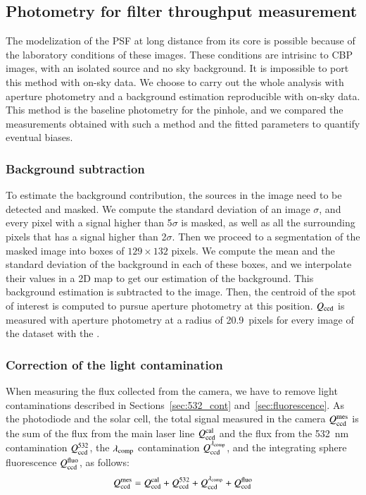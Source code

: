 \subsection{Photometry for filter throughput measurement}
\label{sec:photometry_small}

The modelization of the PSF at long distance from its core is possible because of the laboratory conditions of these images. These conditions are intrisinc to CBP images, with an isolated source and no sky background. It is impossible to port this method with on-sky data. We choose to carry out the whole analysis with aperture photometry and a background estimation reproducible with on-sky data. This method is the baseline photometry for the \spinhole pinhole, and we compared the measurements obtained with such a method and the fitted parameters to quantify eventual biases. 

\subsubsection{Background subtraction}
\label{sec:bkg}

To estimate the background contribution, the sources in the image need to be detected and masked. We compute the standard deviation of an image $\sigma$, and every pixel with a signal higher than 5$\sigma$ is masked, as well as all the surrounding pixels that has a signal higher than 2$\sigma$. Then we proceed to a segmentation of the masked image into boxes of $129\times132$ pixels. We compute the mean and the standard deviation of the background in each of these boxes, and we interpolate their values in a 2D map to get our estimation of the background. This background estimation is subtracted to the image. Then, the centroid of the spot of interest is computed to pursue aperture photometry at this position. $Q_{\mathrm{ccd}}$ is measured with aperture photometry at a radius of \SI{20.9}{pixels} for every image of the dataset with the \spinhole.

\subsubsection{Correction of the light contamination}\label{sec:sd_contaminations}

When measuring the flux collected from the \SD camera, we have to remove light contaminations described in Sections~\ref{sec:532_cont} and~\ref{sec:fluorescence}. As the photodiode and the solar cell, the total signal measured in the \SD camera $Q_{\mathrm{ccd}}^{\mathrm{mes}}$ is the sum of the flux from the main laser line $Q_{\mathrm{ccd}}^{\mathrm{cal}}$ and the flux from the \SI{532}{\nm} contamination $Q_{\mathrm{ccd}}^{532}$, the $\lambda_{\rm comp}$ contamination $Q_{\mathrm{ccd}}^{\lambda_{\rm comp}}$, and the integrating sphere fluorescence $Q_{\mathrm{ccd}}^{\mathrm{fluo}}$, as follows:
\begin{equation}
    Q_{\mathrm{ccd}}^{\mathrm{mes}} = Q_{\mathrm{ccd}}^{\mathrm{cal}} + Q_{\mathrm{ccd}}^{532} + Q_{\mathrm{ccd}}^{\lambda_{\rm comp}} + Q_{\mathrm{ccd}}^{\mathrm{fluo}}
    \label{eq:qccd_mes}
\end{equation}

